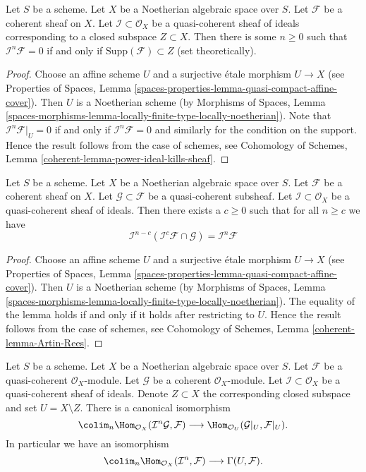 \begin{lemma}
\label{lemma-power-ideal-kills-sheaf}
Let $S$ be a scheme. Let $X$ be a Noetherian algebraic space over $S$.
Let $\mathcal{F}$ be a coherent sheaf on $X$. Let
$\mathcal{I} \subset \mathcal{O}_X$ be a quasi-coherent sheaf of ideals
corresponding to a closed subspace $Z \subset X$. Then there is some
$n \geq 0$ such that $\mathcal{I}^n\mathcal{F} = 0$ if and only if
$\text{Supp}(\mathcal{F}) \subset Z$ (set theoretically).
\end{lemma}

\begin{proof}
Choose an affine scheme $U$ and a surjective \'etale morphism $U \to X$
(see Properties of Spaces, Lemma
\ref{spaces-properties-lemma-quasi-compact-affine-cover}).
Then $U$ is a Noetherian scheme (by
Morphisms of Spaces, Lemma
\ref{spaces-morphisms-lemma-locally-finite-type-locally-noetherian}).
Note that $\mathcal{I}^n\mathcal{F}|_U = 0$ if and only if
$\mathcal{I}^n\mathcal{F} = 0$ and similarly for the condition on
the support. Hence the result follows from the case of schemes, see
Cohomology of Schemes, Lemma \ref{coherent-lemma-power-ideal-kills-sheaf}.
\end{proof}

\begin{lemma}
\label{lemma-Artin-Rees}
Let $S$ be a scheme. Let $X$ be a Noetherian algebraic space over $S$.
Let $\mathcal{F}$ be a coherent sheaf on $X$. Let
$\mathcal{G} \subset \mathcal{F}$ be a quasi-coherent subsheaf.
Let $\mathcal{I} \subset \mathcal{O}_X$ be a quasi-coherent sheaf of
ideals. Then there exists a $c \geq 0$ such that for all $n \geq c$ we
have
$$
\mathcal{I}^{n - c}(\mathcal{I}^c\mathcal{F} \cap \mathcal{G})
=
\mathcal{I}^n\mathcal{F}
$$
\end{lemma}

\begin{proof}
Choose an affine scheme $U$ and a surjective \'etale morphism $U \to X$
(see Properties of Spaces, Lemma
\ref{spaces-properties-lemma-quasi-compact-affine-cover}).
Then $U$ is a Noetherian scheme (by
Morphisms of Spaces, Lemma
\ref{spaces-morphisms-lemma-locally-finite-type-locally-noetherian}).
The equality of the lemma holds if and only if it holds after
restricting to $U$. Hence the result follows from the case of schemes, see
Cohomology of Schemes, Lemma \ref{coherent-lemma-Artin-Rees}.
\end{proof}

\begin{lemma}
\label{lemma-homs-over-open}
Let $S$ be a scheme. Let $X$ be a Noetherian algebraic space over $S$.
Let $\mathcal{F}$ be a quasi-coherent $\mathcal{O}_X$-module.
Let $\mathcal{G}$ be a coherent $\mathcal{O}_X$-module.
Let $\mathcal{I} \subset \mathcal{O}_X$ be a quasi-coherent sheaf of
ideals. Denote $Z \subset X$ the corresponding closed subspace and
set $U = X \setminus Z$. There is a canonical isomorphism
$$
\colim_n \Hom_{\mathcal{O}_X}(\mathcal{I}^n\mathcal{G}, \mathcal{F})
\longrightarrow
\Hom_{\mathcal{O}_U}(\mathcal{G}|_U, \mathcal{F}|_U).
$$
In particular we have an isomorphism
$$
\colim_n \Hom_{\mathcal{O}_X}(\mathcal{I}^n, \mathcal{F})
\longrightarrow
\Gamma(U, \mathcal{F}).
$$
\end{lemma}


